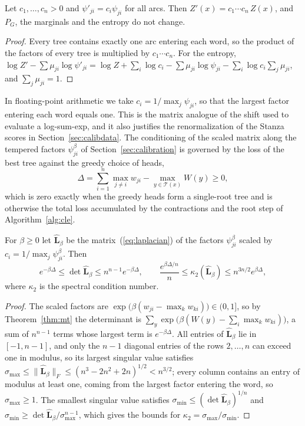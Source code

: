 \documentclass[mathematics,article,submit,pdftex,oneauthor]{Definitions/mdpi}
\newcommand{\T}{\mathcal T}
\newcommand{\Lh}{\hat{\mathbf L}}
\begin{document}
\begin{Lemma}\label{lem:scaling}
Let $c_1,\dots,c_n>0$ and $\psi'_{ji}=c_i\psi_{ji}$ for all arcs.
Then $Z'(x)=c_1\cdots c_n\,Z(x)$, and $P_G$, the marginals and the entropy do not change.
\end{Lemma}
\begin{proof}
Every tree contains exactly one arc entering each word, so the product of the factors of every tree is multiplied by $c_1\cdots c_n$.
For the entropy, $\log Z'-\sum\mu_{ji}\log\psi'_{ji}=\log Z+\sum_i\log c_i-\sum\mu_{ji}\log\psi_{ji}-\sum_i\log c_i\sum_j\mu_{ji}$, and $\sum_j\mu_{ji}=1$.
\end{proof}

In floating-point arithmetic we take $c_i=1/\max_j\psi_{ji}$, so that the largest factor entering each word equals one.
This is the matrix analogue of the shift used to evaluate a log-sum-exp, and it also justifies the renormalization of the Stanza scores in Section~\ref{sec:calibdata}.
The conditioning of the scaled matrix along the tempered factors $\psi_{ji}^\beta$ of Section~\ref{sec:calibration} is governed by the loss of the best tree against the greedy choice of heads,
\begin{equation}\label{eq:delta}
\Delta=\sum_{i=1}^{n}\max_{j\neq i}w_{ji}-\max_{y\in\T(x)}W(y)\geqslant0,
\end{equation}
which is zero exactly when the greedy heads form a single-root tree and is otherwise the total loss accumulated by the contractions and the root step of Algorithm~\ref{alg:cle}.

\begin{Lemma}\label{lem:conditioning}
For $\beta\geqslant0$ let $\Lh_\beta$ be the matrix~(\ref{eq:laplacian}) of the factors $\psi_{ji}^\beta$ scaled by $c_i=1/\max_j\psi_{ji}^\beta$. Then
\begin{equation}\label{eq:detbounds}
e^{-\beta\Delta}\leqslant\det\Lh_\beta\leqslant n^{n-1}e^{-\beta\Delta},\qquad
\frac{e^{\beta\Delta/n}}{n}\leqslant\kappa_2(\Lh_\beta)\leqslant n^{3n/2}e^{\beta\Delta},
\end{equation}
where $\kappa_2$ is the spectral condition number.
\end{Lemma}
\begin{proof}
The scaled factors are $\exp\bigl(\beta(w_{ji}-\max_kw_{ki})\bigr)\in(0,1]$, so by Theorem~\ref{thm:mt} the determinant is $\sum_y\exp\bigl(\beta(W(y)-\sum_i\max_kw_{ki})\bigr)$, a sum of $n^{n-1}$ terms whose largest term is $e^{-\beta\Delta}$.
All entries of $\Lh_\beta$ lie in $[-1,n-1]$, and only the $n-1$ diagonal entries of the rows $2,\dots,n$ can exceed one in modulus, so its largest singular value satisfies $\sigma_{\max}\leqslant\|\Lh_\beta\|_F\leqslant(n^3-2n^2+2n)^{1/2}<n^{3/2}$; every column contains an entry of modulus at least one, coming from the largest factor entering the word, so $\sigma_{\max}\geqslant1$.
The smallest singular value satisfies $\sigma_{\min}\leqslant(\det\Lh_\beta)^{1/n}$ and $\sigma_{\min}\geqslant\det\Lh_\beta/\sigma_{\max}^{n-1}$, which gives the bounds for $\kappa_2=\sigma_{\max}/\sigma_{\min}$.
\end{proof}
\end{document}
